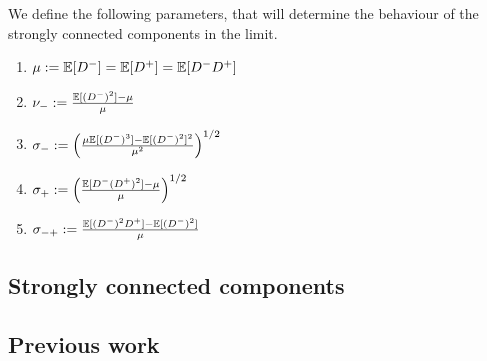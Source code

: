 We define the following parameters, that will determine the behaviour of the strongly connected components in the limit.
\begin{enumerate}
    \item $\mu:={\mathbb E}[D^-]={\mathbb E}[D^+]={\mathbb E}[D^-D^+]$
    \item $\nu_-:=\frac{{\mathbb E}[(D^-)^2]-\mu}{\mu}$ 
    \item $\sigma_-:=\left(\frac{\mu{\mathbb E}[(D^-)^3]-{\mathbb E}[(D^-)^2]^2}{\mu^2}\right)^{1/2}$ 
    \item $\sigma_+:=\left(\frac{{\mathbb E}[D^-(D^+)^2]-\mu}{\mu}\right)^{1/2}$ 
    \item $\sigma_{-+}:=\frac{{\mathbb E}[(D^-)^2D^+]-{\mathbb E}[(D^-)^2]}{\mu}$ 
\end{enumerate}
\subsection{Strongly connected components}



\subsection{Previous work}


